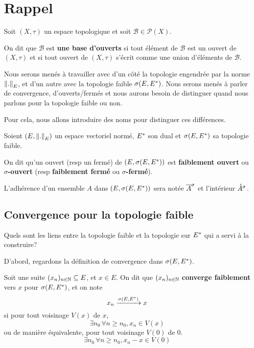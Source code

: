 \section{Rappel}

\begin{definition}
	Soit $(X, \tau)$ un espace topologique et soit $\mathcal{B} \in
	\mathcal{P}(X)$.

	On dit que \textbf{$\mathcal{B}$} est \textbf{une base d'ouverts} si tout
	élément de $\mathcal{B}$ est un ouvert de $(X, \tau)$ et si tout ouvert de
	$(X, \tau)$ s'écrit comme une union d'éléments de $\mathcal{B}$.
\end{definition}

Nous serons menés à travailler avec d'un côté la topologie engendrée par la
norme $\norm{.}_{E}$, et d'un autre avec la topologie faible
$\sigma(E, E^{*})$. Nous serons menés à parler de convergence, d'ouverts/fermés et
nous aurons besoin de distinguer quand nous parlons pour la topologie faible ou
non.

Pour cela, nous allons introduire des noms pour distinguer ces différences.


\begin{definition}
	Soient $(E, \norm{.}_{E})$ un espace vectoriel normé,
	$E^{*}$ son dual et $\sigma(E, E^{*})$ sa topologie faible.

	On dit qu'un ouvert (resp un fermé) de $(E, \sigma(E, E^{*}))$ est
	\textbf{faiblement ouvert} ou \textbf{$\sigma$-ouvert} (resp
	\textbf{faiblement fermé} ou \textbf{$\sigma$-fermé}).

	L'adhérence d'un ensemble $A$ dans $(E, \sigma(E, E^{*}))$ sera notée
	$\overline{A}^{\sigma}$ et l'intérieur $\mathring{A}^{\sigma}$.
\end{definition}

\subsection{Convergence pour la topologie faible}
Quels sont les liens entre la topologie faible et la topologie sur $E^{*}$
qui a servi à la construire?

D'abord, regardons la définition de convergence dans $\sigma(E, E^{*})$.
\begin{definition}
	Soit une suite $(x_{n})_{n \in \mathbb{N}} \subseteq E$, et $x \in E$.
	On dit que $(x_{n})_{n \in \mathbb{N}}$ \textbf{converge faiblement} vers $x$
	pour $\sigma(E, E^{*})$, et on note
	\begin{equation}
		x_{n} \xrightarrow{\sigma(E, E^{*})} x
	\end{equation}
	si pour tout voisinage $V(x)$ de $x$,
	\begin{equation}
		\exists n_{0} \, \forall n \geq n_{0}, x_{n} \in V(x)
	\end{equation}
	ou de manière équivalente, pour tout voisinage $V(0)$ de $0$.
	\begin{equation}
		\exists n_{0} \, \forall n \geq n_{0}, x_{n} - x \in V(0)
	\end{equation}
\end{definition}

